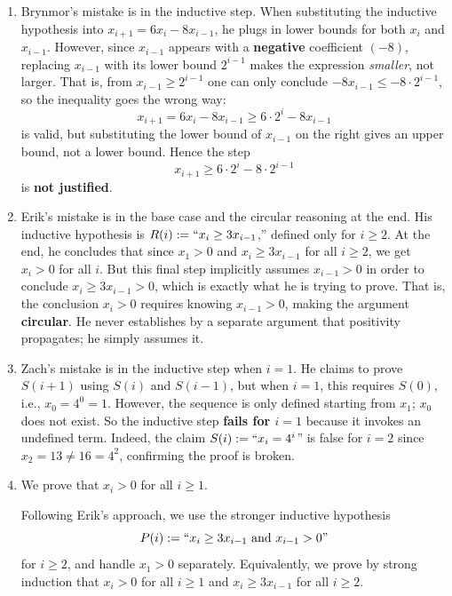 \documentclass[11pt]{article}
\begin{document}
\begin{enumerate}[label=\textbf{(\alph*)}]

\item Brynmor's mistake is in the inductive step. When substituting the inductive
hypothesis into $x_{i+1} = 6x_i - 8x_{i-1}$, he plugs in lower bounds for both $x_i$
and $x_{i-1}$. However, since $x_{i-1}$ appears with a \textbf{negative} coefficient
$(-8)$, replacing $x_{i-1}$ with its lower bound $2^{i-1}$ makes the expression
\textit{smaller}, not larger. That is, from $x_{i-1} \geq 2^{i-1}$ one can only
conclude $-8x_{i-1} \leq -8 \cdot 2^{i-1}$, so the inequality goes the wrong way:
\[
    x_{i+1} = 6x_i - 8x_{i-1} \geq 6 \cdot 2^i - 8x_{i-1}
\]
is valid, but substituting the lower bound of $x_{i-1}$ on the right gives an upper
bound, not a lower bound. Hence the step
\[
    x_{i+1} \geq 6 \cdot 2^i - 8 \cdot 2^{i-1}
\]
is \textbf{not justified}.

\item Erik's mistake is in the base case and the circular reasoning at the end. His
inductive hypothesis is $R(i) := ``x_i \geq 3x_{i-1}$,'' defined only for $i \geq 2$.
At the end, he concludes that since $x_1 > 0$ and $x_i \geq 3x_{i-1}$ for all
$i \geq 2$, we get $x_i > 0$ for all $i$. But this final step implicitly assumes
$x_{i-1} > 0$ in order to conclude $x_i \geq 3x_{i-1} > 0$, which is exactly what
he is trying to prove. That is, the conclusion $x_i > 0$ requires knowing
$x_{i-1} > 0$, making the argument \textbf{circular}. He never establishes by a
separate argument that positivity propagates; he simply assumes it.

\item Zach's mistake is in the inductive step when $i = 1$. He claims to prove
$S(i+1)$ using $S(i)$ and $S(i-1)$, but when $i = 1$, this requires $S(0)$, i.e.,
$x_0 = 4^0 = 1$. However, the sequence is only defined starting from $x_1$; $x_0$
does not exist. So the inductive step \textbf{fails for $i = 1$} because it invokes
an undefined term. Indeed, the claim $S(i) := ``x_i = 4^i$'' is false for $i = 2$
since $x_2 = 13 \neq 16 = 4^2$, confirming the proof is broken.

\item We prove that $x_i > 0$ for all $i \geq 1$.

Following Erik's approach, we use the stronger inductive hypothesis
\[
    P(i) := ``x_i \geq 3x_{i-1} \text{ and } x_{i-1} > 0\text{''}
\]
for $i \geq 2$, and handle $x_1 > 0$ separately. Equivalently, we prove by strong
induction that $x_i > 0$ for all $i \geq 1$ and $x_i \geq 3x_{i-1}$ for all
$i \geq 2$.


\end{enumerate}
\end{document}
